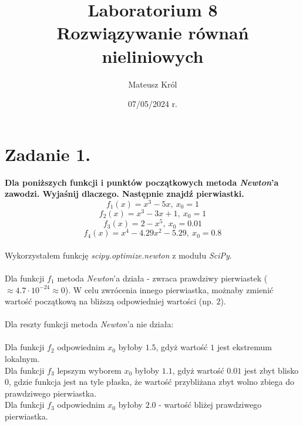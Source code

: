 \documentclass{article}
\title{%
Laboratorium 8\\
  \huge Rozwiązywanie równań nieliniowych}
\author{Mateusz Król}
\date{07/05/2024 r.}
\begin{document}
\maketitle

 
\section*{Zadanie 1.}
\textbf{Dla poniższych funkcji i punktów początkowych metoda 
\textit{Newton}'a
zawodzi. Wyjaśnij dlaczego. Następnie znajdź pierwiastki.
$$f_1(x) = x^3-5x,\ x_0=1$$
$$f_2(x) = x^3-3x+1,\ x_0=1$$
$$f_3(x) = 2-x^5,\ x_0=0.01$$
$$f_4(x) = x^4-4.29x^2-5.29,\ x_0=0.8$$} \\
\null\quad
Wykorzystałem funkcję \textit{scipy.optimize.newton} z modułu
\textit{SciPy}. \\\\
Dla funkcji $f_1$ metoda \textit{Newton}'a działa - zwraca prawdziwy
pierwiastek ($\approx 4.7 \cdot 10^{-24} \approx 0$). W celu zwrócenia
innego pierwiastka, możnaby zmienić wartość początkową na bliższą
odpowiedniej wartości (np. $2$). \\\\
Dla reszty funkcji metoda \textit{Newton}'a nie działa: \\\\
Dla funkcji $f_2$ odpowiednim $x_0$ byłoby $1.5$, gdyż wartość $1$ jest
ekstremum lokalnym. \\
Dla funkcji $f_3$ lepszym wyborem $x_0$ byłoby $1.1$, gdyż wartość
$0.01$ jest zbyt blisko 0, gdzie funkcja jest na tyle płaska, że
wartość przybliżana zbyt wolno zbiega do prawdziwego pierwiastka. \\
Dla funkcji $f_3$ odpowiednim $x_0$ byłoby $2.0$ - wartość bliżej 
prawdziwego pierwiastka. \\\\
\end{document}
